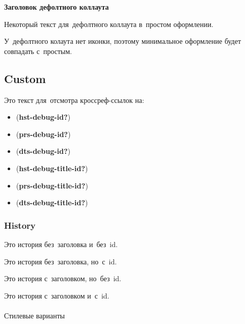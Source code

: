 \documentclass[
  russian,
  letterpaper,
  DIV=11,
  numbers=noendperiod,
  oneside]{scrreprt}
\makeatletter
\let\oldparagraph\paragraph
\renewcommand{\paragraph}{
    \@ifstar
      \xxxParagraphStar
      \xxxParagraphNoStar
  }
\newcommand{\xxxParagraphStar}[1]{\oldparagraph*{#1}\mbox{}}
\newcommand{\xxxParagraphNoStar}[1]{\oldparagraph{#1}\mbox{}}
\providecommand{\tightlist}{%
  \setlength{\itemsep}{0pt}\setlength{\parskip}{0pt}}
\theoremstyle{definition}
\theoremstyle{plain}
\theoremstyle{plain}
\theoremstyle{definition}
\theoremstyle{plain}
\theoremstyle{plain}
\theoremstyle{plain}
\theoremstyle{plain}
\theoremstyle{definition}
\theoremstyle{remark}
\makeatother
\begin{document}
\begin{tcolorbox}[enhanced jigsaw, rightrule=.15mm, opacityback=0, left=2mm, leftrule=.75mm, breakable, bottomrule=.15mm, colframe=quarto-callout-color-frame, arc=.35mm, colback=white, toprule=.15mm]

\vspace{-3mm}\textbf{Заголовок дефолтного коллаута}\vspace{3mm}

Некоторый текст для~дефолтного коллаута в~простом оформлении.

У~дефолтного колаута нет иконки, поэтому минимальное оформление будет
совпадать с~простым.

\end{tcolorbox}

\subsection{Custom}\label{debug-callout-custom}

Это текст для~отсмотра кроссреф-ссылок на:

\begin{itemize}
\tightlist
\item
  (\textbf{hst-debug-id?})
\item
  (\textbf{prs-debug-id?})
\item
  (\textbf{dts-debug-id?})
\item
  (\textbf{hst-debug-title-id?})
\item
  (\textbf{prs-debug-title-id?})
\item
  (\textbf{dts-debug-title-id?})
\end{itemize}

\subsubsection{History}\label{debug-callout-history}

Это история без~заголовка и~без~id.

\label{hst-debug-id}
Это история без~заголовка, но~с~id.

Это история с~заголовком, но~без~id.

\label{hst-debug-title-id}
Это история с~заголовком и~с~id.

\paragraph{Стилевые варианты}\label{debug-callout-history-appearance}
\end{document}
